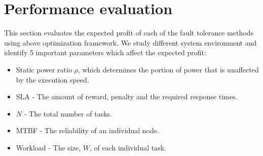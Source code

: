 %
%
%

\section{Performance evaluation}

This section evaluates the expected profit of each of the fault tolerance
methods using above optimization framework. We study different system environment and identify 5
important parameters which affect the expected profit:
\begin{itemize}
\item Static power ratio $\rho$, which determines the portion of power that is unaffected by the execution speed.
\item SLA - The amount of reward, penalty and the required response times.
\item $N$ - The total number of tasks.
\item MTBF - The reliability of an individual node.
\item Workload - The size, $W$, of each individual task.
\end{itemize}


